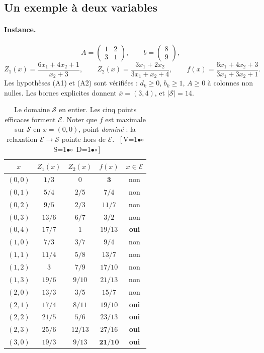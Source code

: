\documentclass[11pt,a4paper]{article}
\theoremstyle{plain}
\theoremstyle{remark}
\newcommand{\Ecal}{\mathcal{E}}
\newcommand{\Scal}{\mathcal{S}}
\newcommand{\cfgm}[1]{\ifnum#1=1$\bullet$\else$\circ$\fi}
\newcommand{\conf}[3]{%
  \textsf{\footnotesize[\,V\cfgm{#1}\ S\cfgm{#2}\ D\cfgm{#3}\,]}}
\begin{document}
\subsection{Un exemple à deux variables}
\label{sec:ex2}

\paragraph{Instance.}
\[
  A=\begin{pmatrix}1&2\\3&1\end{pmatrix},\qquad b=\begin{pmatrix}8\\9\end{pmatrix},
\]
\[
  Z_1(x)=\frac{6x_1+4x_2+1}{x_2+3},\qquad
  Z_2(x)=\frac{3x_1+2x_2}{3x_1+x_2+4},\qquad
  f(x)=\frac{6x_1+4x_2+3}{3x_1+3x_2+1}.
\]
Les hypothèses (A1) et (A2) sont vérifiées : $d_k\ge 0$, $b_k\ge 1$, $A\ge 0$
à colonnes non nulles. Les bornes explicites donnent
$\overline{x}=(3,4)$, et $|\Scal|=14$.

\begin{table}[H]
\centering
\caption{Le domaine $\Scal$ en entier. Les cinq points efficaces forment
$\Ecal$. Noter que $f$ est maximale sur $\Scal$ en $x=(0,0)$, point
\emph{dominé} : la relaxation $\Ecal\to\Scal$ pointe hors de $\Ecal$.\ \conf{0}{0}{0}}
\label{tab:ex2S}
\small
\begin{tabular}{ccccc}
\toprule
$x$ & $Z_1(x)$ & $Z_2(x)$ & $f(x)$ & $x\in\Ecal$\\
\midrule
$(0,0)$ & $1/3$ & $0$ & $\mathbf{3}$ & non\\
$(0,1)$ & $5/4$ & $2/5$ & $7/4$ & non\\
$(0,2)$ & $9/5$ & $2/3$ & $11/7$ & non\\
$(0,3)$ & $13/6$ & $6/7$ & $3/2$ & non\\
$(0,4)$ & $17/7$ & $1$ & $19/13$ & \textbf{oui}\\
$(1,0)$ & $7/3$ & $3/7$ & $9/4$ & non\\
$(1,1)$ & $11/4$ & $5/8$ & $13/7$ & non\\
$(1,2)$ & $3$ & $7/9$ & $17/10$ & non\\
$(1,3)$ & $19/6$ & $9/10$ & $21/13$ & non\\
$(2,0)$ & $13/3$ & $3/5$ & $15/7$ & non\\
$(2,1)$ & $17/4$ & $8/11$ & $19/10$ & \textbf{oui}\\
$(2,2)$ & $21/5$ & $5/6$ & $23/13$ & \textbf{oui}\\
$(2,3)$ & $25/6$ & $12/13$ & $27/16$ & \textbf{oui}\\
$(3,0)$ & $19/3$ & $9/13$ & $\mathbf{21/10}$ & \textbf{oui}\\
\bottomrule
\end{tabular}
\end{table}
\end{document}
